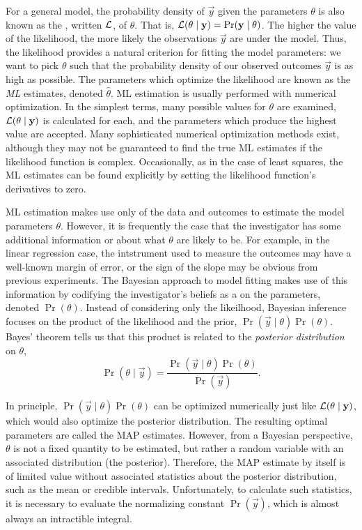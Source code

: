 For a general model, the probability density of $\vec{y}$ given the parameters
$\theta$ is also known as the , written $\mathcal{L}$, of $\theta$.
That is, $\mathcal{L}(\theta \mid \mathbf{y}) = \Pr(\mathbf{y} \mid \theta)$. The higher the
value of the likelihood, the more likely the observations $\vec{y}$ are under
the model. Thus, the likelihood provides a natural criterion for fitting the
model parameters: we want to pick $\theta$ such that the probability density of
our observed outcomes $\vec{y}$ is as high as possible. The parameters which
optimize the likelihood are known as the \textit{\gls{ML}} estimates, denoted
$\hat{\theta}$. \Gls{ML} estimation is usually performed with numerical
optimization. In the simplest terms, many possible values for $\theta$ are
examined, $\mathcal{L}(\theta \mid \mathbf{y})$ is calculated for each, and the parameters
which produce the highest value are accepted. Many sophisticated numerical
optimization methods exist, although they may not be guaranteed to find the
true \gls{ML} estimates if the likelihood function is complex. Occasionally, as
in the case of least squares, the \gls{ML} estimates can be found explicitly by
setting the likelihood function's derivatives to zero.

\Gls{ML} estimation makes use only of the data and outcomes to estimate the
model parameters $\theta$. However, it is frequently the case that the
investigator has some additional information or  about what
$\theta$ are likely to be. For example, in the linear regression case, the
intstrument used to measure the outcomes may have a well-known margin of error,
or the sign of the slope may be obvious from previous experiments. The Bayesian
approach to model fitting makes use of this information by codifying the
investigator's beliefs as a  on the parameters,
denoted $\Pr(\theta)$. Instead of considering only the likeilhood, Bayesian
inference focuses on the product of the likelihood and the prior, $\Pr(\vec{y}
\mid \theta) \Pr(\theta)$. Bayes' theorem tells us that this product is related
to the \textit{posterior distribution} on $\theta$,
\[
  \Pr(\theta \mid \vec{y}) = \frac{\Pr(\vec{y} \mid \theta) \Pr(\theta)}
                                  {\Pr(\vec{y})}.
\]

In principle, $\Pr(\vec{y} \mid \theta) \Pr(\theta)$ can be optimized
numerically just like $\mathcal{L}(\theta \mid \mathbf{y})$, which would also optimize the
posterior distribution. The resulting optimal parameters are called the
\gls{MAP} estimates. However, from a Bayesian perspective, $\theta$ is not a
fixed quantity to be estimated, but rather a random variable with an associated
distribution (the posterior). Therefore, the \gls{MAP} estimate by itself is of
limited value without associated statistics about the posterior distribution,
such as the mean or credible intervals. Unfortunately, to calculate such
statistics, it is necessary to evaluate the normalizing constant
$\Pr(\vec{y})$, which is almost always an intractible integral.

